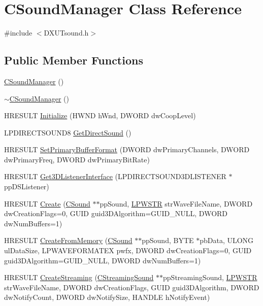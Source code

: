 \hypertarget{class_c_sound_manager}{
\section{CSoundManager Class Reference}
\label{class_c_sound_manager}
}


{\ttfamily \#include $<$DXUTsound.h$>$}\subsection*{Public Member Functions}
\begin{DoxyCompactItemize}
\item 
\hyperlink{class_c_sound_manager_ae8358c75282bcceb23bd23ea9328e407}{CSoundManager} ()
\item 
\hyperlink{class_c_sound_manager_a75bc0ad3cc339baeb29372632c02f5f2}{$\sim$CSoundManager} ()
\item 
HRESULT \hyperlink{class_c_sound_manager_a5360f8c247b45d00f141b528892ac4dc}{Initialize} (HWND hWnd, DWORD dwCoopLevel)
\item 
LPDIRECTSOUND8 \hyperlink{class_c_sound_manager_a4cf5b72143f7bb5f268b4152008de1dd}{GetDirectSound} ()
\item 
HRESULT \hyperlink{class_c_sound_manager_a2e20be973d38797e82362577b9156927}{SetPrimaryBufferFormat} (DWORD dwPrimaryChannels, DWORD dwPrimaryFreq, DWORD dwPrimaryBitRate)
\item 
HRESULT \hyperlink{class_c_sound_manager_aac5c452d3d4314c8d3aeb16f9c143652}{Get3DListenerInterface} (LPDIRECTSOUND3DLISTENER $\ast$ppDSListener)
\item 
HRESULT \hyperlink{class_c_sound_manager_a7fb7f2a69f7b703da0c81988733d7e31}{Create} (\hyperlink{class_c_sound}{CSound} $\ast$$\ast$ppSound, \hyperlink{_d_x_u_tgui_8cpp_a6ad64a19933213d15128e5fcd09bc1a6}{LPWSTR} strWaveFileName, DWORD dwCreationFlags=0, GUID guid3DAlgorithm=GUID\_\-NULL, DWORD dwNumBuffers=1)
\item 
HRESULT \hyperlink{class_c_sound_manager_aeb9aceb7a20e21ec18922fe71cd58307}{CreateFromMemory} (\hyperlink{class_c_sound}{CSound} $\ast$$\ast$ppSound, BYTE $\ast$pbData, ULONG ulDataSize, LPWAVEFORMATEX pwfx, DWORD dwCreationFlags=0, GUID guid3DAlgorithm=GUID\_\-NULL, DWORD dwNumBuffers=1)
\item 
HRESULT \hyperlink{class_c_sound_manager_abbcd3543cde00e741c02ae2864516a2c}{CreateStreaming} (\hyperlink{class_c_streaming_sound}{CStreamingSound} $\ast$$\ast$ppStreamingSound, \hyperlink{_d_x_u_tgui_8cpp_a6ad64a19933213d15128e5fcd09bc1a6}{LPWSTR} strWaveFileName, DWORD dwCreationFlags, GUID guid3DAlgorithm, DWORD dwNotifyCount, DWORD dwNotifySize, HANDLE hNotifyEvent)
\end{DoxyCompactItemize}
